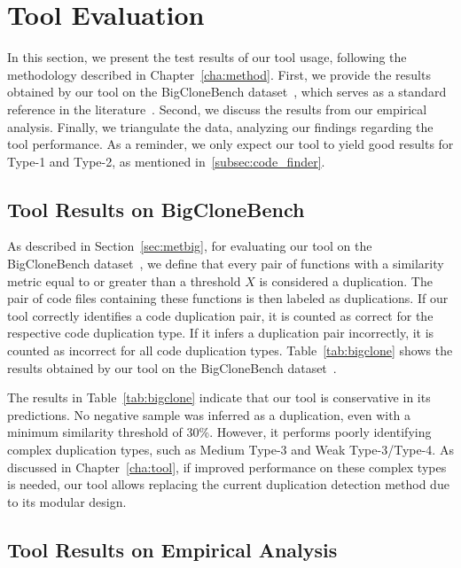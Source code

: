 \section{Tool Evaluation}
\label{sec:eval}

In this section, we present the test results of our tool usage, following the 
methodology described in Chapter~\ref{cha:method}. First, we provide the results 
obtained by our tool on the BigCloneBench dataset~\citep{bigclonebench}, which 
serves as a standard reference in the literature~\citep{litreview}. Second, we 
discuss the results from our empirical analysis. Finally, we triangulate the data, 
analyzing our findings regarding the tool performance. 
As a reminder, we only expect our tool to yield good results for Type-1 and Type-2,
as mentioned in~\ref{subsec:code_finder}.

\subsection{Tool Results on BigCloneBench}



As described in Section~\ref{sec:metbig}, for evaluating our tool on the BigCloneBench dataset~\citep{bigclonebench}, we define 
that every pair of functions with a similarity metric equal to or greater than a threshold \( X \) is considered a duplication. 
The pair of code files containing these functions is then labeled as duplications. If our tool correctly 
identifies a code duplication pair, it is counted as correct for the respective code duplication type. If it infers a 
duplication pair incorrectly, it is counted as incorrect for all code duplication types. Table~\ref{tab:bigclone} shows the results obtained by our tool on the BigCloneBench dataset~\citep{bigclonebench}.

The results in Table~\ref{tab:bigclone} indicate that our tool is conservative in its predictions. No negative sample was inferred as a duplication, even with a minimum similarity threshold of 30\%. However, it performs poorly identifying complex duplication types, such as Medium Type-3 and Weak Type-3/Type-4. As discussed in Chapter~\ref{cha:tool}, if improved performance on these complex types is needed, our tool allows replacing the current duplication detection method due to its modular design.

\subsection{Tool Results on Empirical Analysis}

